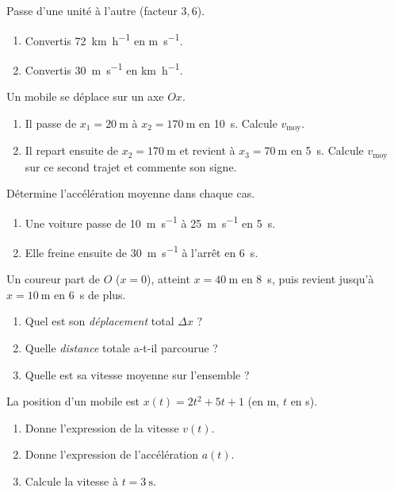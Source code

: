 \documentclass[11pt,a4paper]{article}
\begin{document}

\begin{exo}
Passe d'une unité à l'autre (facteur $3{,}6$).
\begin{enumerate}[label=\alph*)]
  \item Convertis \qty{72}{\kilo\metre\per\hour} en \si{\metre\per\second}.
  \item Convertis \qty{30}{\metre\per\second} en \si{\kilo\metre\per\hour}.
\end{enumerate}
\end{exo}

\begin{exo}
Un mobile se déplace sur un axe $Ox$.
\begin{enumerate}[label=\alph*)]
  \item Il passe de $x_1=\qty{20}{\metre}$ à $x_2=\qty{170}{\metre}$ en \qty{10}{\second}. Calcule $v_{\text{moy}}$.
  \item Il repart ensuite de $x_2=\qty{170}{\metre}$ et revient à $x_3=\qty{70}{\metre}$ en \qty{5}{\second}. Calcule $v_{\text{moy}}$ sur ce second trajet et commente son signe.
\end{enumerate}
\end{exo}

\begin{exo}
Détermine l'accélération moyenne dans chaque cas.
\begin{enumerate}[label=\alph*)]
  \item Une voiture passe de \qty{10}{\metre\per\second} à \qty{25}{\metre\per\second} en \qty{5}{\second}.
  \item Elle freine ensuite de \qty{30}{\metre\per\second} à l'arrêt en \qty{6}{\second}.
\end{enumerate}
\end{exo}

\begin{exo}
Un coureur part de $O$ ($x=0$), atteint $x=\qty{40}{\metre}$ en \qty{8}{\second}, puis revient
jusqu'à $x=\qty{10}{\metre}$ en \qty{6}{\second} de plus.
\begin{enumerate}[label=\alph*)]
  \item Quel est son \emph{déplacement} total $\Delta x$ ?
  \item Quelle \emph{distance} totale a-t-il parcourue ?
  \item Quelle est sa vitesse moyenne sur l'ensemble ?
\end{enumerate}
\end{exo}

\begin{exo}
La position d'un mobile est $x(t)=2t^2+5t+1$ (en \si{\metre}, $t$ en \si{\second}).
\begin{enumerate}[label=\alph*)]
  \item Donne l'expression de la vitesse $v(t)$.
  \item Donne l'expression de l'accélération $a(t)$.
  \item Calcule la vitesse à $t=\qty{3}{\second}$.
\end{enumerate}
\end{exo}
\end{document}
